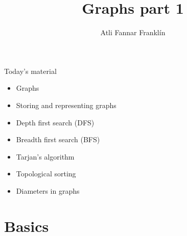 \documentclass{beamer}
\title{Graphs part 1}
\author{Atli Fannar Franklín}
\institute{\href{http://ru.is/td}{School of Computer Science} \\[2pt] \href{http://ru.is}{Reykjavík University}}
\begin{document}
\maketitle

\begin{frame}[plain]{Today's material}
    \begin{itemize}
        \item Graphs
        \item Storing and representing graphs
        \item Depth first search (DFS)
        \item Breadth first search (BFS)
        \item Tarjan's algorithm
        \item Topological sorting
        \item Diameters in graphs
    \end{itemize}
\end{frame}

\section*{Basics}
\end{document}

